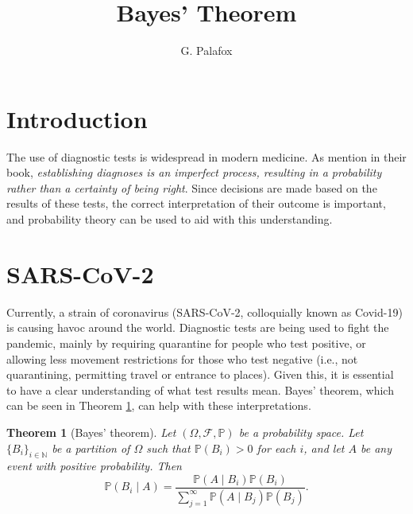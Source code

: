 \documentclass[letterpaper, 10 pt, conference]{article}
\title{Bayes' Theorem
}
\author{G. Palafox}
\newtheorem{thm}{Theorem}
\newcommand\N{\ensuremath{\mathbb{N}}}
\renewcommand{\P}{\ensuremath{\mathbb{P}}}
\begin{document}
\maketitle

\section{Introduction}
The use of diagnostic tests is widespread in modern medicine. As \citet{clinical_epidemiology} mention in their book, \textit{establishing diagnoses is an imperfect process, resulting in a probability rather than a certainty of being right}. Since decisions are made based on the results of these tests, the correct interpretation of their outcome is important, and probability theory can be used to aid with this understanding.

\section{SARS-CoV-2}
 Currently, a strain of coronavirus (SARS-CoV-2, colloquially known as Covid-19) is causing havoc around the world. Diagnostic tests are being used to fight the pandemic, mainly by requiring quarantine for people who test positive, or allowing less movement restrictions for those who test negative (i.e., not quarantining, permitting travel or entrance to places). Given this, it is essential to have a clear understanding of what test results mean. Bayes' theorem, which can be seen in Theorem \ref{bayes_thm}, can help with these interpretations.
 
 \begin{thm}[Bayes' theorem] \label{bayes_thm}
 	Let $(\Omega, \mathcal{F}, \P)$ be a probability space. Let $\lbrace B_i \rbrace_{i \in \N}$ be a partition of $\Omega$ such that $\P(B_i) > 0$ for each $i$, and let $A$ be any event with positive probability. Then
 	\begin{equation}
 	\P(B_i \mid A) = \frac{\P(A \mid B_i) \P(B_i)}{\sum_{j = 1}^{\infty} \P(A \mid B_j) \P(B_j)}.
 	\end{equation}
 \end{thm}
 
\end{document}
